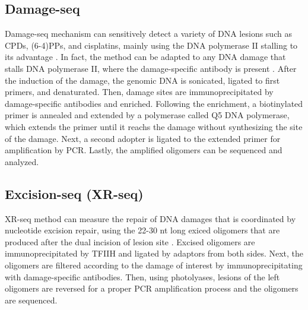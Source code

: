 \subsection{Damage-seq}

Damage-seq mechanism can sensitively detect a variety of DNA lesions such as CPDs, (6-4)PPs, and  cisplatins, mainly using the DNA polymerase II stalling to its advantage \citep{hu2016cisplatin}. In fact, the method can be adapted to any DNA damage that stalls DNA polymerase II, where the damage-specific antibody is present \citep{sancar2016mechanisms}. After the induction of the damage, the genomic DNA is sonicated, ligated to first primers, and denaturated. Then, damage sites are immunoprecipitated by damage-specific antibodies and enriched. Following the enrichment, a biotinylated primer is annealed and extended by a polymerase called Q5 DNA polymerase, which extends the primer until it reachs the damage without synthesizing the site of the damage. Next, a second adopter is ligated to the extended primer for amplification by PCR. Lastly, the amplified oligomers can be sequenced and analyzed.      

\subsection{Excision-seq (XR-seq)}

XR-seq method can measure the repair of DNA damages that is coordinated by nucleotide excision repair, using the 22-30 nt long exiced oligomers that are produced after the dual incision of lesion site \citep{hu2019genome,hu2016cisplatin}. Excised oligomers are immunoprecipitated by TFIIH and ligated by adaptors from both sides. Next, the oligomers are filtered according to the damage of interest by immunoprecipitating with damage-specific antibodies. Then, using photolyases, lesions of the left oligomers are reversed for a proper PCR amplification process and the oligomers are sequenced.
